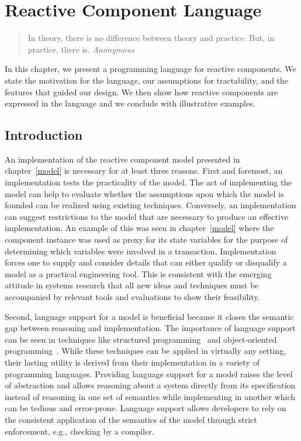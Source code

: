 \chapter{Reactive Component Language\label{language}}

\begin{quote}
In theory, there is no difference between theory and practice. \linebreak
But, in practice, there is.  \emph{Anonymous}
\end{quote}

In this chapter, we present a programming language for reactive components.
We state the motivation for the language, our assumptions for tractability, and the features that guided our design.
We then show how reactive components are expressed in the language and we conclude with illustrative examples.

\section{Introduction}

An implementation of the reactive component model presented in chapter~\ref{model} is necessary for at least three reasons.
First and foremost, an implementation tests the practicality of the model.
The act of implementing the model can help to evaluate whether the assumptions upon which the model is founded can be realized using existing techniques.
Conversely, an implementation can suggest restrictions to the model that are necessary to produce an effective implementation.
An example of this was seen in chapter~\ref{model} where the component instance was used as proxy for its state variables for the purpose of determining which variables were involved in a transaction.
Implementation forces one to supply and consider details that can either qualify or disqualify a model as a practical engineering tool.
This is consistent with the emerging attitude in systems research that all new ideas and techniques must be accompanied by relevant tools and evaluations to show their feasibility.

Second, language support for a model is beneficial because it closes the semantic gap between reasoning and implementation.
The importance of language support can be seen in techniques like structured programming~\cite{dahl1972structured} and object-oriented programming~\cite{booch1982object}.
While these techniques can be applied in virtually any setting, their lasting utility is derived from their implementation in a variety of programming languages.
Providing language support for a model raises the level of abstraction and allows reasoning about a system directly from its specification instead of reasoning in one set of semantics while implementing in another which can be tedious and error-prone.
Language support allows developers to rely on the consistent application of the semantics of the model through strict enforcement, e.g., checking by a compiler.

